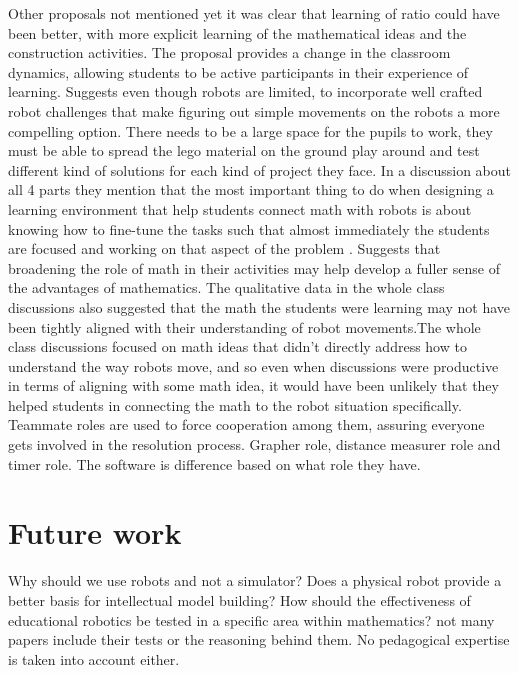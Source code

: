 \bigskip\noindent
Other proposals not mentioned yet
\cite{norton2004using}it was clear that learning of ratio could have been better, with more explicit learning of the mathematical ideas and the construction activities. 
\cite{mitnik2009collaborative} The proposal provides a change in the classroom dynamics, allowing students to be active participants in their experience of learning. 
\cite{silk2011resources} Suggests even though robots are limited, to incorporate well crafted robot challenges that make figuring out simple movements on the robots a more compelling option. 
\cite{lindh2007does} There needs to be a large space for the pupils to work, they must be able to spread the lego material on the ground play around and test different kind of solutions for each kind of project they face.
\cite{silk2011resources} In a discussion about all 4 parts they mention that the most important thing to do when designing a learning environment that help students connect math with robots is about knowing how to fine-tune the tasks such that almost immediately the students are focused and working on that aspect of the problem . 
\cite{silk2011resources} Suggests that broadening the role of math in their activities may help develop a fuller sense of the advantages of mathematics. The qualitative data in the whole class discussions also suggested that the math the students were learning may not have been tightly aligned with their understanding of robot movements.The whole class discussions focused on math ideas that didn’t directly address how to understand the way robots move, and so even when discussions were productive in terms of aligning with some math idea, it would have been unlikely that they helped students in connecting the math to the robot situation specifically. 
\cite{mitnik2009collaborative} Teammate roles are used to force cooperation among them, assuring everyone gets involved in the resolution process. Grapher role, distance measurer role and timer role. The software is difference based on what role they have. 

\section{Future work}
Why should we use robots and not a simulator?
Does a physical robot provide a better basis for intellectual model building?
How should the effectiveness of educational robotics be tested in a specific area within mathematics? not many papers include their tests or the reasoning behind them. No pedagogical expertise is taken into account either.  

